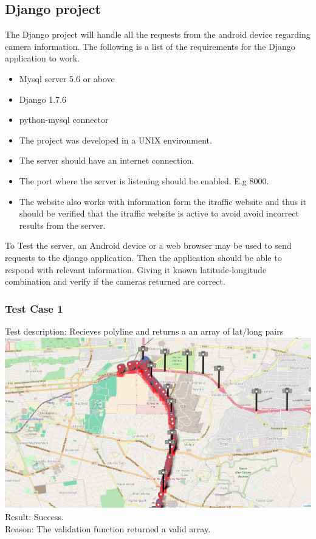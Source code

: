 \documentclass[a4paper,12pt]{article}
\begin{document}
\subsection{Django project}
The Django project will handle all the requests from the android device regarding camera information. The following is a list of the requirements for the Django application to work.
\begin{itemize}
\item Mysql server 5.6 or above
\item Django 1.7.6
\item python-mysql connector
\item The project was developed in a UNIX environment.
\item The server should have an internet connection.
\item The port where the server is listening should be enabled. E.g 8000.
\item The website also works with information form the itraffic website and thus it should be verified that the itraffic website is active to avoid avoid incorrect results from the server.
\end{itemize}
To Test the server, an Android device or a web browser may be used to send requests to the django application. Then the application should be able to respond with relevant information. Giving it known latitude-longitude combination and verify if the cameras returned are correct.
\subsubsection{Test Case 1}
Test description: Recieves polyline and returns a an array of lat/long pairs\\
\includegraphics[scale=0.3]{images/decode_polyline.png}\\
Result: Success.\\
Reason: The validation function returned a valid array.
\end{document}
